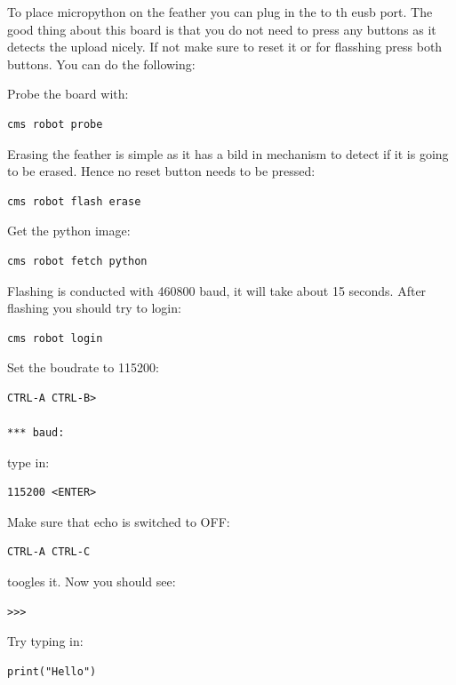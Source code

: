 To place micropython on the feather you can plug in the to th eusb port.
The good thing about this board is that you do not need to press any
buttons as it detects the upload nicely. If not make sure to reset it or
for flasshing press both buttons. You can do the following:

Probe the board with:

\begin{verbatim}
cms robot probe
\end{verbatim}

Erasing the feather is simple as it has a bild in mechanism to detect if
it is going to be erased. Hence no reset button needs to be pressed:

\begin{verbatim}
cms robot flash erase
\end{verbatim}

Get the python image:

\begin{verbatim}
cms robot fetch python
\end{verbatim}

Flashing is conducted with 460800 baud, it will take about 15 seconds.
After flashing you should try to login:

\begin{verbatim}
cms robot login
\end{verbatim}

Set the boudrate to 115200:

\begin{verbatim}
CTRL-A CTRL-B>

*** baud: 
\end{verbatim}

type in:

\begin{verbatim}
115200 <ENTER>
\end{verbatim}

Make sure that echo is switched to OFF:

\begin{verbatim}
CTRL-A CTRL-C
\end{verbatim}

toogles it. Now you should see:

\begin{verbatim}
>>>
\end{verbatim}

Try typing in:

\begin{verbatim}
print("Hello")
\end{verbatim}

